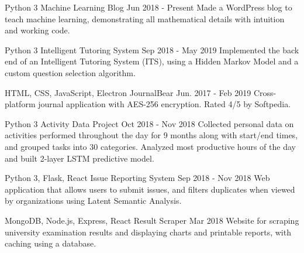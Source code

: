 

\begin{cventries}

  \cventry
    {Python 3} %
    {Machine Learning Blog} %
    {} %
    {Jun 2018 - Present} %
    {
      Made a WordPress blog to teach machine learning, demonstrating all mathematical details with intuition and working code.
    }

  \cventry
    {Python 3} %
    {Intelligent Tutoring System} %
    {} %
    {Sep 2018 - May 2019} %
    {
      Implemented the back end of an Intelligent Tutoring System (ITS), using a Hidden Markov Model and a custom question selection algorithm.
    }

  \cventry
    {HTML, CSS, JavaScript, Electron} %
    {JournalBear} %
    {} %
    {Jun. 2017 - Feb 2019} %
    {
      Cross-platform journal application with AES-256 encryption. Rated 4/5 by Softpedia.
    }

  \cventry
    {Python 3} %
    {Activity Data Project} %
    {} %
    {Oct 2018 - Nov 2018} %
    {
      Collected personal data on activities performed throughout the day for 9 months along with start/end times, and grouped tasks into 30 categories. Analyzed most productive hours of the day and built 2-layer LSTM predictive model.
    }

  \cventry
    {Python 3, Flask, React} %
    {Issue Reporting System} %
    {} %
    {Sep 2018 - Nov 2018} %
    {
      Web application that allows users to submit issues, and filters duplicates when viewed by organizations using Latent Semantic Analysis.
    }

  \cventry
    {MongoDB, Node.js, Express, React} %
    {Result Scraper} %
    {} %
    {Mar 2018} %
    {
      Website for scraping university examination results and displaying charts and printable reports, with caching using a database.
    }


\end{cventries}
